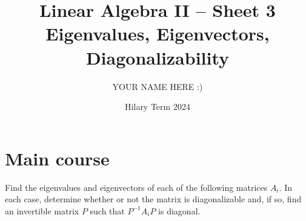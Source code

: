\documentclass[answers]{exam}
\title{Linear Algebra II -- Sheet 3\\Eigenvalues, Eigenvectors, Diagonalizability}
\author{YOUR NAME HERE :)}
\date{Hilary Term 2024}
\begin{document}
\maketitle
\section*{Main course}
\begin{questions}

\question%
Find the eigenvalues and eigenvectors of each of the following matrices $A_{i}$. In each case, determine whether or not the matrix is diagonalizable and, if so, find an invertible matrix $P$ such that $P^{-1} A_{i} P$ is diagonal.
\begin{parts}
\part%
\vspace{2em}\phantom{}\vspace{-3em}\[
	A_{1}=\begin{pmatrix}
		2 & 1 & 2 \\
		0 & 0 & 1 \\
		0 & 1 & 0
	\end{pmatrix};
\]

\part%
\vspace{2em}\phantom{}\vspace{-3em}\[
	A_{2}=\begin{pmatrix}
		1 & 1 & 0 \\
		-1 & 3 & 0 \\
		-1 & 4 & -1
	\end{pmatrix};
\]

\part%
\vspace{2em}\phantom{}\vspace{-3em}\[
	A_{3}=\begin{pmatrix}
		2 & 1 & 1 \\
		1 & 2 & 1 \\
		1 & 1 & 2
	\end{pmatrix}.
\]
\end{parts}



\question%
\begin{parts}

\end{parts}
\end{questions}
\end{document}
